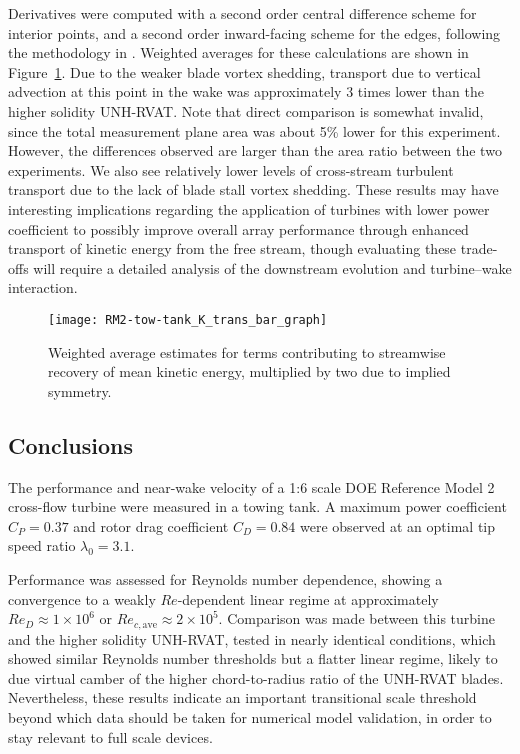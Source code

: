 Derivatives were computed with a second order central difference scheme for
interior points, and a second order inward-facing scheme for the edges,
following the methodology in \cite{Bachant2015-JoT}. Weighted averages for these
calculations are shown in Figure~\ref{fig:Ktransport}. Due to the weaker blade
vortex shedding, transport due to vertical advection at this point in the wake
was approximately 3 times lower than the higher solidity UNH-RVAT. Note that
direct comparison is somewhat invalid, since the total measurement plane area
was about 5\% lower for this experiment. However, the differences observed are
larger than the area ratio between the two experiments. We also see relatively
lower levels of cross-stream turbulent transport due to the lack of blade stall
vortex shedding. These results may have interesting implications regarding the
application of turbines with lower power coefficient to possibly improve overall
array performance through enhanced transport of kinetic energy from the free
stream, though evaluating these trade-offs will require a detailed analysis of
the downstream evolution and turbine--wake interaction.

\begin{figure}
    \centering

    \texttt{[image: RM2-tow-tank\_K\_trans\_bar\_graph]}
    
    \caption{Weighted average estimates for terms contributing to streamwise
        recovery of mean kinetic energy, multiplied by two due to implied symmetry.}
    
    \label{fig:Ktransport}
\end{figure}


\subsection{Conclusions}

The performance and near-wake velocity of a 1:6 scale DOE Reference Model 2
cross-flow turbine were measured in a towing tank. A maximum power coefficient
$C_P = 0.37$ and rotor drag coefficient $C_D = 0.84$ were observed at an optimal
tip speed ratio $\lambda_0 = 3.1$.

Performance was assessed for Reynolds number dependence, showing a convergence
to a weakly $Re$-dependent linear regime at approximately $Re_D \approx 1 \times
10^6$ or $Re_{c,\mathrm{ave}} \approx 2 \times 10^5$. Comparison was made
between this turbine and the higher solidity UNH-RVAT, tested in nearly
identical conditions, which showed similar Reynolds number thresholds but a
flatter linear regime, likely to due virtual camber of the higher
chord-to-radius ratio of the UNH-RVAT blades. Nevertheless, these results
indicate an important transitional scale threshold beyond which data should be
taken for numerical model validation, in order to stay relevant to full scale
devices.

